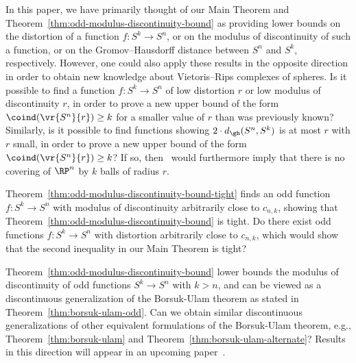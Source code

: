 \documentclass[11pt, reqno, english]{amsart}
\begin{document}
\begin{question}
\label{ques:other-direction}
In this paper, we have primarily thought of our Main Theorem and Theorem~\ref{thm:odd-modulus-discontinuity-bound} as providing lower bounds on the distortion of a function $f\colon S^k \to S^n$, or on the modulus of discontinuity of such a function, or on the Gromov--Hausdorff distance between $S^n$ and $S^k$, respectively.
However, one could also apply these results in the opposite direction in order to obtain new knowledge about Vietoris--Rips complexes of spheres.
Is it possible to find a function $f\colon S^k \to S^n$ of low distortion $r$ or low modulus of discontinuity $r$, in order to prove a new upper bound of the form $\coind(\vr{S^n}{r}) \ge k$ for a smaller value of $r$ than was previously known?
Similarly, is it possible to find functions showing $2\cdot d_\gh(S^n,S^k)$ is at most $r$ with $r$ small, in order to prove a new upper bound of the form $\coind(\vr{S^n}{r}) \ge k$?
If so, then~\cite[Theorem~3]{ABF2} would furthermore imply that there is no covering of $\RP^n$ by $k$ balls of radius $r$.
\end{question}

\begin{question}
Theorem~\ref{thm:odd-modulus-discontinuity-bound-tight} finds an odd function $f\colon S^k \to S^n$ with modulus of discontinuity arbitrarily close to $c_{n,k}$, showing that Theorem~\ref{thm:odd-modulus-discontinuity-bound} is tight.
Do there exist odd functions $f\colon S^k \to S^n$ with distortion arbitrarily close to $c_{n,k}$, which would show that the second inequality in our Main Theorem is tight?
\end{question}

\begin{question}
\label{ques:modulus-Euclidean}
Theorem~\ref{thm:odd-modulus-discontinuity-bound} lower bounds the modulus of discontinuity of odd functions $S^k \to S^n$ with $k>n$, and can be viewed as a discontinuous generalization of the Borsuk-Ulam theorem as stated in Theorem~\ref{thm:borsuk-ulam-odd}.
Can we obtain similar discontinuous generalizations of other equivalent formulations of the Borsuk-Ulam theorem, e.g., Theorem~\ref{thm:borsuk-ulam} and Theorem~\ref{thm:borsuk-ulam-alternate}?
Results in this direction will appear in an upcoming paper~\cite{adams2022quantifying}.
\end{question}
\end{document}
